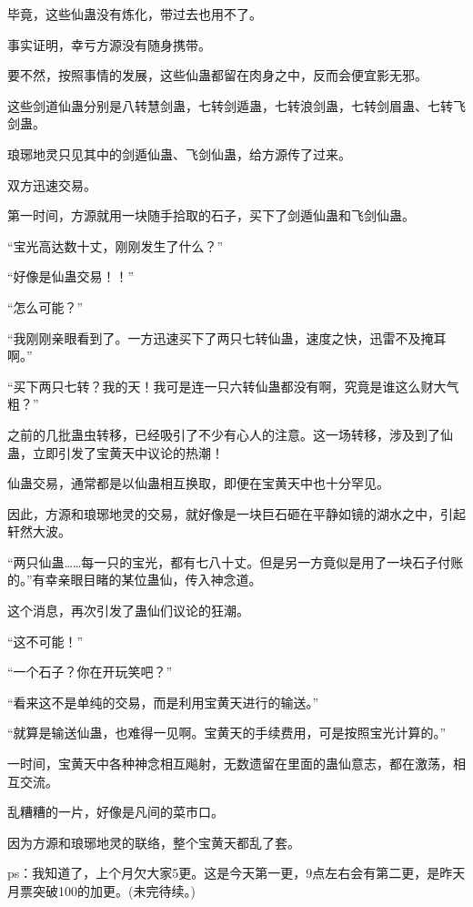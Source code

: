 \begin{this_body}
毕竟，这些仙蛊没有炼化，带过去也用不了。

事实证明，幸亏方源没有随身携带。

要不然，按照事情的发展，这些仙蛊都留在肉身之中，反而会便宜影无邪。

这些剑道仙蛊分别是八转慧剑蛊，七转剑遁蛊，七转浪剑蛊，七转剑眉蛊、七转飞剑蛊。

琅琊地灵只见其中的剑遁仙蛊、飞剑仙蛊，给方源传了过来。

双方迅速交易。

第一时间，方源就用一块随手拾取的石子，买下了剑遁仙蛊和飞剑仙蛊。

“宝光高达数十丈，刚刚发生了什么？”

“好像是仙蛊交易！！”

“怎么可能？”

“我刚刚亲眼看到了。一方迅速买下了两只七转仙蛊，速度之快，迅雷不及掩耳啊。”

“买下两只七转？我的天！我可是连一只六转仙蛊都没有啊，究竟是谁这么财大气粗？”

之前的几批蛊虫转移，已经吸引了不少有心人的注意。这一场转移，涉及到了仙蛊，立即引发了宝黄天中议论的热潮！

仙蛊交易，通常都是以仙蛊相互换取，即便在宝黄天中也十分罕见。

因此，方源和琅琊地灵的交易，就好像是一块巨石砸在平静如镜的湖水之中，引起轩然大波。

“两只仙蛊……每一只的宝光，都有七八十丈。但是另一方竟似是用了一块石子付账的。”有幸亲眼目睹的某位蛊仙，传入神念道。

这个消息，再次引发了蛊仙们议论的狂潮。

“这不可能！”

“一个石子？你在开玩笑吧？”

“看来这不是单纯的交易，而是利用宝黄天进行的输送。”

“就算是输送仙蛊，也难得一见啊。宝黄天的手续费用，可是按照宝光计算的。”

一时间，宝黄天中各种神念相互飚射，无数遗留在里面的蛊仙意志，都在激荡，相互交流。

乱糟糟的一片，好像是凡间的菜市口。

因为方源和琅琊地灵的联络，整个宝黄天都乱了套。

ps：我知道了，上个月欠大家5更。这是今天第一更，9点左右会有第二更，是昨天月票突破100的加更。(未完待续。)

\end{this_body}

